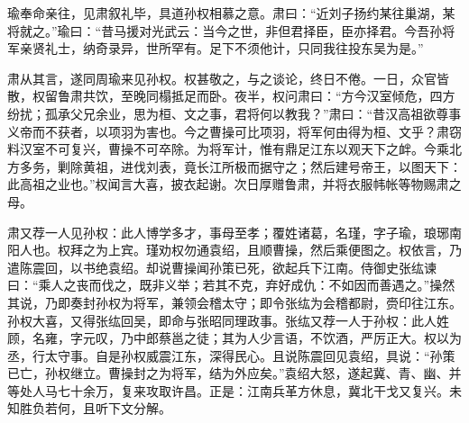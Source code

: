 瑜奉命亲往，见肃叙礼毕，具道孙权相慕之意。肃曰：“近刘子扬约某往巢湖，某将就之。”瑜曰：“昔马援对光武云：当今之世，非但君择臣，臣亦择君。今吾孙将军亲贤礼士，纳奇录异，世所罕有。足下不须他计，只同我往投东吴为是。”

肃从其言，遂同周瑜来见孙权。权甚敬之，与之谈论，终日不倦。一日，众官皆散，权留鲁肃共饮，至晚同榻抵足而卧。夜半，权问肃曰：“方今汉室倾危，四方纷扰；孤承父兄余业，思为桓、文之事，君将何以教我？”肃曰：“昔汉高祖欲尊事义帝而不获者，以项羽为害也。今之曹操可比项羽，将军何由得为桓、文乎？肃窃料汉室不可复兴，曹操不可卒除。为将军计，惟有鼎足江东以观天下之衅。今乘北方多务，剿除黄祖，进伐刘表，竟长江所极而据守之；然后建号帝王，以图天下：此高祖之业也。”权闻言大喜，披衣起谢。次日厚赠鲁肃，并将衣服帏帐等物赐肃之母。

肃又荐一人见孙权：此人博学多才，事母至孝；覆姓诸葛，名瑾，字子瑜，琅琊南阳人也。权拜之为上宾。瑾劝权勿通袁绍，且顺曹操，然后乘便图之。权依言，乃遣陈震回，以书绝袁绍。却说曹操闻孙策已死，欲起兵下江南。侍御史张纮谏曰：“乘人之丧而伐之，既非义举；若其不克，弃好成仇：不如因而善遇之。”操然其说，乃即奏封孙权为将军，兼领会稽太守；即令张纮为会稽都尉，赍印往江东。孙权大喜，又得张纮回吴，即命与张昭同理政事。张纮又荐一人于孙权：此人姓顾，名雍，字元叹，乃中郎蔡邕之徒；其为人少言语，不饮酒，严厉正大。权以为丞，行太守事。自是孙权威震江东，深得民心。且说陈震回见袁绍，具说：“孙策已亡，孙权继立。曹操封之为将军，结为外应矣。”袁绍大怒，遂起冀、青、幽、并等处人马七十余万，复来攻取许昌。正是：江南兵革方休息，冀北干戈又复兴。未知胜负若何，且听下文分解。